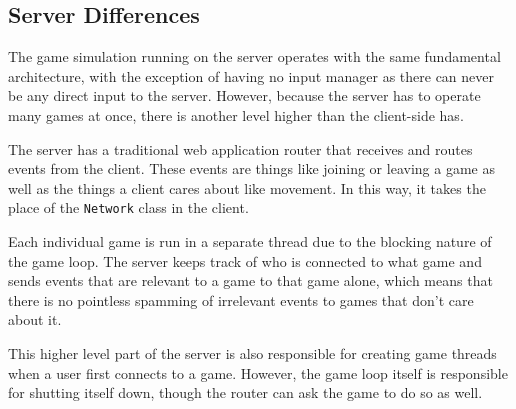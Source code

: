 \subsection{Server Differences}
The game simulation running on the server operates with the same fundamental architecture, with the exception of having no input manager as there can never be any direct input to the server. However, because the server has to operate many games at once, there is another level higher than the client-side has.

The server has a traditional web application router that receives and routes events from the client. These events are things like joining or leaving a game as well as the things a client cares about like movement. In this way, it takes the place of the \texttt{Network} class in the client.

Each individual game is run in a separate thread due to the blocking nature of the game loop. The server keeps track of who is connected to what game and sends events that are relevant to a game to that game alone, which means that there is no pointless spamming of irrelevant events to games that don't care about it.

This higher level part of the server is also responsible for creating game threads when a user first connects to a game. However, the game loop itself is responsible for shutting itself down, though the router can ask the game to do so as well.





